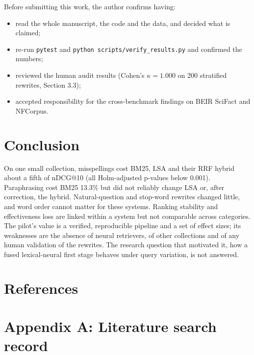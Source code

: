\documentclass[
  11pt,
]{article}
\providecommand{\tightlist}{%
  \setlength{\itemsep}{0pt}\setlength{\parskip}{0pt}}
\begin{document}
Before submitting this work, the author confirms having:

\begin{itemize}
\tightlist
\item
  read the whole manuscript, the code and the data, and decided what is
  claimed;
\item
  re-run \texttt{pytest} and \texttt{python\ scripts/verify\_results.py}
  and confirmed the numbers;
\item
  reviewed the human audit results (Cohen's $\kappa = 1.000$ on 200 stratified rewrites, Section 3.3);
\item
  accepted responsibility for the cross-benchmark findings on BEIR SciFact and NFCorpus.
\end{itemize}

\hypertarget{conclusion}{%
\section{Conclusion}\label{conclusion}}

On one small collection, misspellings cost BM25, LSA and their RRF
hybrid about a fifth of nDCG@10 (all Holm-adjusted p-values below
0.001). Paraphrasing cost BM25 13.3\% but did not reliably change LSA
or, after correction, the hybrid. Natural-question and stop-word
rewrites changed little, and word order cannot matter for these systems.
Ranking stability and effectiveness loss are linked within a system but
not comparable across categories. The pilot's value is a verified,
reproducible pipeline and a set of effect sizes; its weaknesses are the
absence of neural retrievers, of other collections and of any human
validation of the rewrites. The research question that motivated it, how
a fused lexical-neural first stage behaves under query variation, is not
answered.

\hypertarget{references}{%
\section*{References}\label{references}}



\hypertarget{appendix-a-literature-search-record}{%
\section*{Appendix A: Literature search
record}\label{appendix-a-literature-search-record}}
\end{document}
